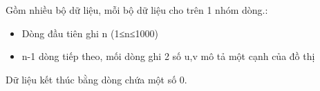Gồm nhiều bộ dữ liệu, mỗi bộ dữ liệu cho trên 1 nhóm dòng.:  
\begin{itemize}
	\item     Dòng đầu tiên ghi n (1≤n≤1000)   
	\item     n-1 dòng tiếp theo, mối dòng ghi 2 số u,v mô tả một cạnh của đồ thị   
\end{itemize}

   Dữ liệu kết thúc bằng dòng chứa một số 0.  

\